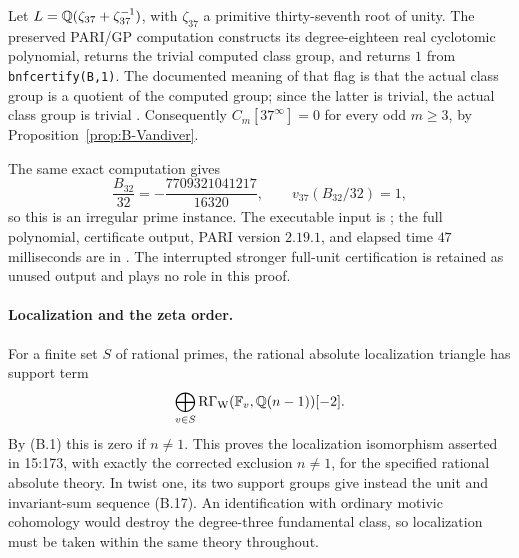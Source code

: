 \begin{example}
\label{ex:B-Vandiver37}
Let \(L=\mathbb Q(\zeta_{37}+\zeta_{37}^{-1})\), with
\(\zeta_{37}\) a primitive thirty-seventh root of unity.
The preserved PARI/GP computation constructs its degree-eighteen
real cyclotomic polynomial, returns the trivial computed class
group, and returns \(1\) from \texttt{bnfcertify(B,1)}.
The documented meaning of that flag is that the actual class
group is a quotient of the computed group; since the latter is
trivial, the actual class group is trivial
\cite{BPariClass2026}.  Consequently
\(C_m[37^\infty]=0\) for every odd \(m\ge3\), by
Proposition~\ref{prop:B-Vandiver}.

The same exact computation gives
\[
 \frac{B_{32}}{32}=-\frac{7709321041217}{16320},\qquad
 v_{37}(B_{32}/32)=1,
\]
so this is an irregular prime instance.  The executable input is
; the full polynomial,
certificate output, PARI version \(2.19.1\), and elapsed time
\(47\) milliseconds are in
.
The interrupted stronger full-unit certification is retained as
unused output and plays no role in this proof.
\end{example}
\paragraph{Localization and the zeta order.}
For a finite set \(S\) of rational primes, the rational absolute
localization triangle has support term
\[
 \bigoplus_{v\in S}\operatorname{R\Gamma}_{\mathrm W}(\mathbb F_v,\mathbb Q(n-1))[-2].
\]
By (B.1) this is zero if \(n\ne1\).  This proves the localization
isomorphism asserted in 15:173, with exactly the corrected exclusion
\(n\ne1\), for the specified rational absolute theory.  In twist
one, its two support groups give instead the unit and invariant-sum
sequence (B.17).  An identification with ordinary motivic cohomology
would destroy the degree-three fundamental class, so localization
must be taken within the same theory throughout.

